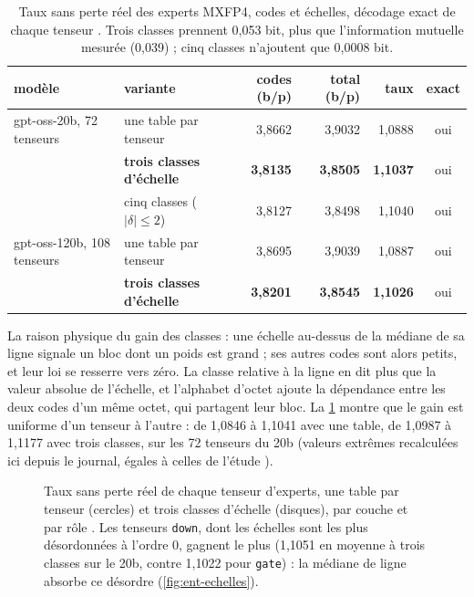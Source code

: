 \begin{table}[ht]
\centering\small
\caption[Taux sans perte réel de MXFP4, décodage exact]{Taux sans perte réel des experts MXFP4, codes et échelles, décodage exact de chaque tenseur \mes. Trois classes prennent 0,053 bit, plus que l'information mutuelle mesurée (0,039) ; cinq classes n'ajoutent que 0,0008 bit.}
\label{tab:ent-taux}
\begin{tabular}{@{}llrrrc@{}}
\toprule
modèle & variante & codes (b/p) & total (b/p) & taux & exact \\
\midrule
gpt-oss-20b, 72 tenseurs & une table par tenseur & 3,8662 & 3,9032 & 1,0888 & oui \\
 & \textbf{trois classes d'échelle} & \textbf{3,8135} & \textbf{3,8505} & \textbf{1,1037} & oui \\
 & cinq classes ($|\delta| \le 2$) & 3,8127 & 3,8498 & 1,1040 & oui \\
gpt-oss-120b, 108 tenseurs & une table par tenseur & 3,8695 & 3,9039 & 1,0887 & oui \\
 & \textbf{trois classes d'échelle} & \textbf{3,8201} & \textbf{3,8545} & \textbf{1,1026} & oui \\
\bottomrule
\end{tabular}
\end{table}

La raison physique du gain des classes : une échelle au-dessus de la médiane de sa ligne signale un bloc dont un poids est grand ; ses autres codes sont alors petits, et leur loi se resserre vers zéro. La classe relative à la ligne en dit plus que la valeur absolue de l'échelle, et l'alphabet d'octet ajoute la dépendance entre les deux codes d'un même octet, qui partagent leur bloc. La \cref{fig:ent-taux} montre que le gain est uniforme d'un tenseur à l'autre : de 1,0846 à 1,1041 avec une table, de 1,0987 à 1,1177 avec trois classes, sur les 72 tenseurs du 20b (valeurs extrêmes recalculées ici depuis le journal, égales à celles de l'étude \calc).

\begin{figure}[ht]
\centering
\GrapheTauxTenseurs
\caption[Taux sans perte réel de chaque tenseur d'experts]{Taux sans perte réel de chaque tenseur d'experts, une table par tenseur (cercles) et trois classes d'échelle (disques), par couche et par rôle \mes. Les tenseurs \texttt{down}, dont les échelles sont les plus désordonnées à l'ordre 0, gagnent le plus (1,1051 en moyenne à trois classes sur le 20b, contre 1,1022 pour \texttt{gate}) : la médiane de ligne absorbe ce désordre (\cref{fig:ent-echelles}).}
\label{fig:ent-taux}
\end{figure}

